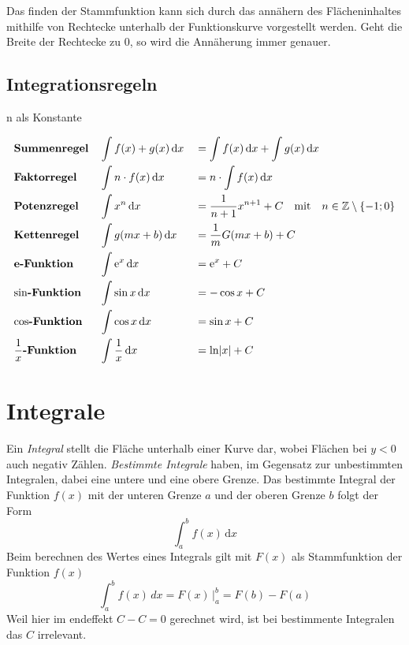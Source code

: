 \documentclass{article}
\begin{document}
Das finden der Stammfunktion kann sich durch das annähern des Flächeninhaltes mithilfe von Rechtecke unterhalb der Funktionskurve vorgestellt werden. Geht die Breite der Rechtecke zu $0$, so wird die Annäherung immer genauer.
 
\subsection{Integrationsregeln} 
$\mathrm{n}$ als Konstante 
\begin{multicols}{2} %
 \noindent \begin{align*}
  &\text{\textbf{Summenregel}} &&\int f(x) + g(x) \,\mathrm{d}x &&= \int f(x) \,\mathrm{d}x + \int g(x) \,\mathrm{d}x \\ 
  &\text{\textbf{Faktorregel}} &&\int n \cdot f(x) \,\mathrm{d}x &&= n \cdot \int f(x) \,\mathrm{d}x \\
  &\text{\textbf{Potenzregel}} &&\int x^n \,\mathrm{d}x &&= \frac{1}{n+1}x^{n+1} + C \quad \text{mit} \quad n \in \mathbb{Z} \setminus \{-1; 0\} \\
  &\text{\textbf{Kettenregel}} &&\int g(mx+b) \,\mathrm{d}x &&= \frac{1}{m} G(mx+b) + C \\     
  &\text{\textbf{e-Funktion}} &&\int \mathrm{e}^x \,\mathrm{d}x &&= \mathrm{e}^x + C \\
  &\text{\textbf{$\sin$-Funktion}} &&\int \sin x \,\mathrm{d}x &&= -\cos x + C \\
  &\text{\textbf{$\cos$-Funktion}} &&\int \cos x \,\mathrm{d}x &&= \sin x + C \\
  &\text{\textbf{$\frac{1}{x}$-Funktion}} &&\int \frac{1}{x} \,\mathrm{d}x &&= \ln \lvert x \rvert + C \\
 \end{align*} 
\end{multicols}
 
\section{Integrale}  
Ein \emph{Integral} stellt die Fläche unterhalb einer Kurve dar, wobei Flächen bei $y<0$ auch negativ Zählen. \emph{Bestimmte Integrale} haben, im Gegensatz zur unbestimmten Integralen, dabei eine untere und eine obere Grenze. Das bestimmte Integral der Funktion $f(x)$ mit der unteren Grenze $a$ und der oberen Grenze $b$ folgt der Form 
\[
 \int_a^b f(x) \,\mathrm{d}x
\]
Beim berechnen des Wertes eines Integrals gilt mit $F(x)$ als Stammfunktion der Funktion $f(x)$
\[
 \int_a^b f(x) \,dx =
 F(x) \,\Bigr|_a^b =
 F(b) - F(a)
\] 
Weil hier im endeffekt $C-C=0$ gerechnet wird, ist bei bestimmente Integralen das $C$ irrelevant.
 
\end{document}
